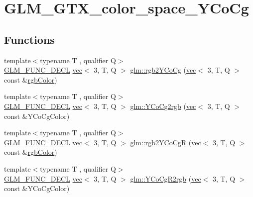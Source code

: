 \hypertarget{group__gtx__color__space___y_co_cg}{}\section{G\+L\+M\+\_\+\+G\+T\+X\+\_\+color\+\_\+space\+\_\+\+Y\+Co\+Cg}
\label{group__gtx__color__space___y_co_cg}
\subsection*{Functions}
\begin{DoxyCompactItemize}
\item 
{\footnotesize template$<$typename T , qualifier Q$>$ }\\\hyperlink{setup_8hpp_ab2d052de21a70539923e9bcbf6e83a51}{G\+L\+M\+\_\+\+F\+U\+N\+C\+\_\+\+D\+E\+CL} \hyperlink{structglm_1_1vec}{vec}$<$ 3, T, Q $>$ \hyperlink{group__gtx__color__space___y_co_cg_ga0606353ec2a9b9eaa84f1b02ec391bc5}{glm\+::rgb2\+Y\+Co\+Cg} (\hyperlink{structglm_1_1vec}{vec}$<$ 3, T, Q $>$ const \&\hyperlink{group__gtx__color__space_ga5f9193be46f45f0655c05a0cdca006db}{rgb\+Color})
\item 
{\footnotesize template$<$typename T , qualifier Q$>$ }\\\hyperlink{setup_8hpp_ab2d052de21a70539923e9bcbf6e83a51}{G\+L\+M\+\_\+\+F\+U\+N\+C\+\_\+\+D\+E\+CL} \hyperlink{structglm_1_1vec}{vec}$<$ 3, T, Q $>$ \hyperlink{group__gtx__color__space___y_co_cg_ga163596b804c7241810b2534a99eb1343}{glm\+::\+Y\+Co\+Cg2rgb} (\hyperlink{structglm_1_1vec}{vec}$<$ 3, T, Q $>$ const \&Y\+Co\+Cg\+Color)
\item 
{\footnotesize template$<$typename T , qualifier Q$>$ }\\\hyperlink{setup_8hpp_ab2d052de21a70539923e9bcbf6e83a51}{G\+L\+M\+\_\+\+F\+U\+N\+C\+\_\+\+D\+E\+CL} \hyperlink{structglm_1_1vec}{vec}$<$ 3, T, Q $>$ \hyperlink{group__gtx__color__space___y_co_cg_ga0389772e44ca0fd2ba4a79bdd8efe898}{glm\+::rgb2\+Y\+Co\+CgR} (\hyperlink{structglm_1_1vec}{vec}$<$ 3, T, Q $>$ const \&\hyperlink{group__gtx__color__space_ga5f9193be46f45f0655c05a0cdca006db}{rgb\+Color})
\item 
{\footnotesize template$<$typename T , qualifier Q$>$ }\\\hyperlink{setup_8hpp_ab2d052de21a70539923e9bcbf6e83a51}{G\+L\+M\+\_\+\+F\+U\+N\+C\+\_\+\+D\+E\+CL} \hyperlink{structglm_1_1vec}{vec}$<$ 3, T, Q $>$ \hyperlink{group__gtx__color__space___y_co_cg_gaf8d30574c8576838097d8e20c295384a}{glm\+::\+Y\+Co\+Cg\+R2rgb} (\hyperlink{structglm_1_1vec}{vec}$<$ 3, T, Q $>$ const \&Y\+Co\+Cg\+Color)
\end{DoxyCompactItemize}


